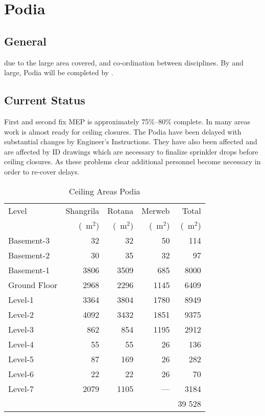 \chapter{Podia}
\newcommand{\sm}{~m$^2$}

\section{General}
\normalsize
{} due to the large area covered, and  co-ordination between disciplines.  By and large, Podia will be completed by \deadline . 

\section{Current Status}

First and second fix MEP  is approximately 75\%--80\% complete. In many areas work is almost ready for ceiling closures. The Podia have been delayed with substantial changes by Engineer's Instructions. They have also been affected and are affected by ID drawings which are necessary to finalize sprinkler drops before ceiling closures. As these problems clear additional personnel become necessary in order to re-cover delays. 

\begin{table}[htbp]
\begin{tabular}{lrrrr}
\toprule
Level		&Shangrila		&Rotana		&Merweb		&Total\\
~                      &(\sm)			&\hfil(\sm)\hfil                            &\hfil(\sm)\hfil                       &\hfil(\sm)\hfil\\
\midrule
Basement-3	&32 	&32 	&50 	&114\\
Basement-2	&30 	&35	&32	&97\\
Basement-1	&3806	&3509	&685 	&8000\\
Ground Floor &2968	&2296	&1145	&6409\\
Level-1		&3364	&3804	&1780	&8949\\
Level-2  	&4092	&3432	&1851	&9375\\
Level-3	 	&862	&854	&1195	&2912\\
Level-4		&55	&55	&26	&136\\
Level-5		&87	&169	&26	&282\\
Level-6		&22	&22	&26	&70\\
Level-7		&2079	&1105   	&---		&3184\\ \cline{5-5}
~		&	&		&		&39 528\\
\bottomrule
\end{tabular}								
\caption{Ceiling Areas Podia}
\label{tbl:ceilings}
\end{table}


